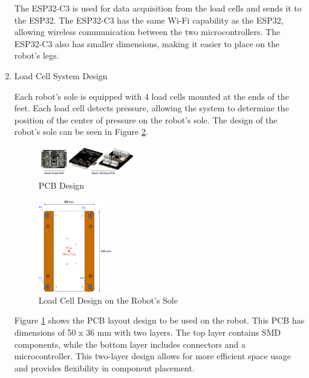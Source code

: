 \begin{enumerate}[label=\Alph*.]
    \hspace*{1em} The ESP32-C3 is used for data acquisition from the load cells and sends it to the ESP32. The ESP32-C3 has the same Wi-Fi capability as the ESP32, allowing wireless communication between the two microcontrollers. The ESP32-C3 also has smaller dimensions, making it easier to place on the robot's legs. 

    \item Load Cell System Design
    \label{subsec:loadcellsystemdesign}

    \hspace*{1em} Each robot's sole is equipped with 4 load cells mounted at the ends of the feet. Each load cell detects pressure, allowing the system to determine the position of the center of pressure on the robot's sole. The design of the robot's sole can be seen in Figure \ref{fig:Dia_LoadCell}.

    \begin{figure} [h] \centering
      \includegraphics[width=0.4\textwidth]{gambar/Desain_PCB.png}
      \caption{PCB Design}
      \label{fig:Desain_PCB}
    \end{figure}

    \begin{figure} [h] \centering
        \includegraphics[width=0.3\textwidth]{gambar/Diagram_LoadCell.png}
        \caption{Load Cell Design on the Robot's Sole}
        \label{fig:Dia_LoadCell}
    \end{figure}
    
    \hspace*{1em} Figure \ref{fig:Desain_PCB} shows the PCB layout design to be used on the robot. This PCB has dimensions of 50 x 36 mm with two layers. The top layer contains SMD components, while the bottom layer includes connectors and a microcontroller. This two-layer design allows for more efficient space usage and provides flexibility in component placement.
    

\end{enumerate}
